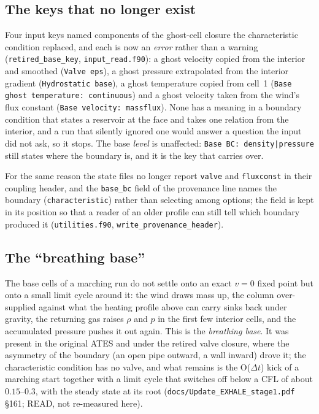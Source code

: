 \documentclass[english,a4paper]{my_memo}
\begin{document}
\subsection{The keys that no longer exist}
\label{sec:retiredkeys}

Four input keys named components of the ghost-cell closure the
characteristic condition replaced, and each is now an \emph{error} rather
than a warning (\texttt{retired\_base\_key}, \texttt{input\_read.f90}): a
ghost velocity copied from the interior and smoothed
(\texttt{Valve eps}), a ghost pressure extrapolated from the interior
gradient (\texttt{Hydrostatic base}), a ghost temperature copied from cell~1
(\texttt{Base ghost temperature: continuous}) and a ghost velocity taken
from the wind's flux constant (\texttt{Base velocity: massflux}). None has a
meaning in a boundary condition that states a reservoir at the face and
takes one relation from the interior, and a run that silently ignored one
would answer a question the input did not ask, so it stops. The base
\emph{level} is unaffected: \texttt{Base BC: density|pressure} still states
where the boundary is, and it is the key that carries over.

For the same reason the state files no longer report \texttt{valve} and
\texttt{fluxconst} in their coupling header, and the \texttt{base\_bc} field
of the provenance line names the boundary (\texttt{characteristic}) rather
than selecting among options; the field is kept in its position so that a
reader of an older profile can still tell which boundary produced it
(\texttt{utilities.f90}, \texttt{write\_provenance\_header}).

\subsection{The ``breathing base''}
\label{sec:breathing}

The base cells of a marching run do not settle onto an exact $v=0$ fixed
point but onto a small limit cycle around it: the wind draws mass up, the
column over-supplied against what the heating profile above can carry sinks
back under gravity, the returning gas raises $\rho$ and $p$ in the first few
interior cells, and the accumulated pressure pushes it out again. This is
the \emph{breathing base}. It was present in the original ATES and under the
retired valve closure, where the asymmetry of the boundary (an open pipe
outward, a wall inward) drove it; the characteristic condition has no valve,
and what remains is the O($\Delta t$) kick of a marching start together with
a limit cycle that switches off below a CFL of about $0.15$--$0.3$, with the
steady state at its root (\texttt{docs/Update\_EXHALE\_stage1.pdf} \S161; READ, not
re-measured here).
\end{document}
